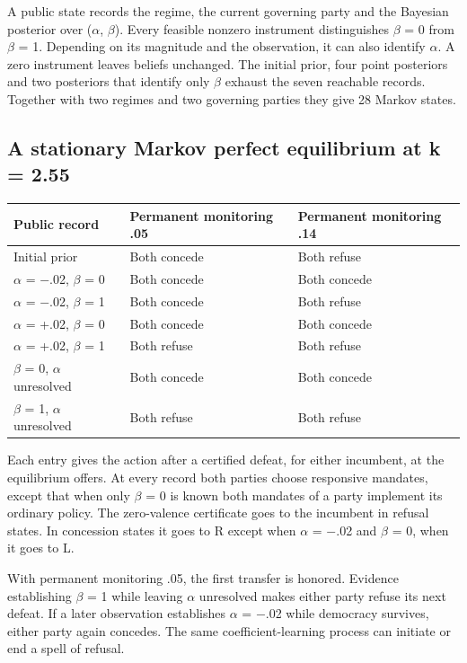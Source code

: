 \documentclass[11pt]{article}
\begin{document}
A public state records the regime, the current governing party and the Bayesian posterior over ($\alpha$, $\beta$). Every feasible nonzero instrument distinguishes $\beta$ = 0 from $\beta$ = 1. Depending on its magnitude and the observation, it can also identify $\alpha$. A zero instrument leaves beliefs unchanged. The initial prior, four point posteriors and two posteriors that identify only $\beta$ exhaust the seven reachable records. Together with two regimes and two governing parties they give 28 Markov states.

\subsection*{A stationary Markov perfect equilibrium at k = 2.55}

\begin{center}\small\begin{tabular}{lll}\toprule
\textbf{Public record} & \textbf{Permanent monitoring .05} & \textbf{Permanent monitoring .14}\\ \midrule
Initial prior & Both concede & Both refuse\\
$\alpha$ = $-$.02, $\beta$ = 0 & Both concede & Both concede\\
$\alpha$ = $-$.02, $\beta$ = 1 & Both concede & Both refuse\\
$\alpha$ = +.02, $\beta$ = 0 & Both concede & Both concede\\
$\alpha$ = +.02, $\beta$ = 1 & Both refuse & Both refuse\\
$\beta$ = 0, $\alpha$ unresolved & Both concede & Both concede\\
$\beta$ = 1, $\alpha$ unresolved & Both refuse & Both refuse\\
\bottomrule\end{tabular}\end{center}

Each entry gives the action after a certified defeat, for either incumbent, at the equilibrium offers. At every record both parties choose responsive mandates, except that when only $\beta$ = 0 is known both mandates of a party implement its ordinary policy. The zero-valence certificate goes to the incumbent in refusal states. In concession states it goes to R except when $\alpha$ = $-$.02 and $\beta$ = 0, when it goes to L.

With permanent monitoring .05, the first transfer is honored. Evidence establishing $\beta$ = 1 while leaving $\alpha$ unresolved makes either party refuse its next defeat. If a later observation establishes $\alpha$ = $-$.02 while democracy survives, either party again concedes. The same coefficient-learning process can initiate or end a spell of refusal.
\end{document}

